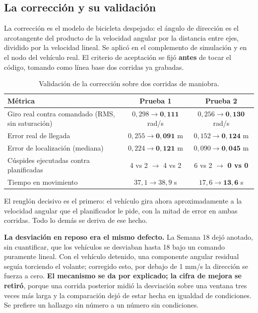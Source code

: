 \documentclass[12pt,letterpaper]{article}
\begin{document}
\subsection{La corrección y su validación}

La corrección es el modelo de bicicleta despejado: el ángulo de dirección es el arcotangente del producto de la velocidad angular por la distancia entre ejes, dividido por la velocidad lineal. Se aplicó en el complemento de simulación y en el nodo del vehículo real. El criterio de aceptación se fijó \textbf{antes} de tocar el código, tomando como línea base dos corridas ya grabadas.

\begin{table}[H]
    \centering
    \small
    \caption{Validación de la corrección sobre dos corridas de maniobra.}
    \label{tab:validacion}
    \begin{tabular}{@{}p{6.4cm}cc@{}}
        \toprule
        \textbf{Métrica} & \textbf{Prueba 1} & \textbf{Prueba 2} \\ \midrule
        Giro real contra comandado (RMS, sin saturación) & $0{,}298 \rightarrow \mathbf{0{,}111}$ rad/s & $0{,}256 \rightarrow \mathbf{0{,}130}$ rad/s \\ \addlinespace
        Error real de llegada & $0{,}255 \rightarrow \mathbf{0{,}091}$ m & $0{,}152 \rightarrow \mathbf{0{,}124}$ m \\ \addlinespace
        Error de localización (mediana) & $0{,}224 \rightarrow \mathbf{0{,}121}$ m & $0{,}090 \rightarrow \mathbf{0{,}045}$ m \\ \addlinespace
        Cúspides ejecutadas contra planificadas & 4 vs 2 $\rightarrow$ 4 vs 2 & 6 vs 2 $\rightarrow$ \textbf{0 vs 0} \\ \addlinespace
        Tiempo en movimiento & $37{,}1 \rightarrow 38{,}9$ s & $17{,}6 \rightarrow \mathbf{13{,}6}$ s \\ \bottomrule
    \end{tabular}
\end{table}

El renglón decisivo es el primero: el vehículo gira ahora aproximadamente a la velocidad angular que el planificador le pide, con la mitad de error en ambas corridas. Todo lo demás se deriva de ese hecho.

\textbf{La desviación en reposo era el mismo defecto.} La Semana 18 dejó anotado, sin cuantificar, que los vehículos se desviaban hasta 18\textdegree{} bajo un comando puramente lineal. Con el vehículo detenido, una componente angular residual seguía torciendo el volante; corregido esto, por debajo de 1 mm/s la dirección se fuerza a cero. \textbf{El mecanismo se da por explicado; la cifra de mejora se retiró}, porque una corrida posterior midió la desviación sobre una ventana tres veces más larga y la comparación dejó de estar hecha en igualdad de condiciones. Se prefiere un hallazgo sin número a un número sin condiciones.
\end{document}
